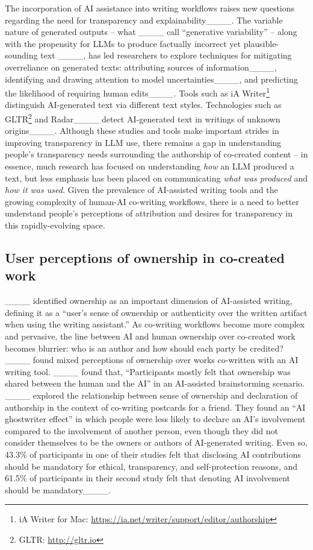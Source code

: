 The incorporation of AI assistance into writing workflows raises new questions regarding the need for transparency and explainability____. The variable nature of generated outputs -- what ____ call ``generative variability'' -- along with the propensity for LLMs to produce factually incorrect yet plausible-sounding text ____, has led researchers to explore techniques for mitigating overreliance on generated texts: attributing sources of information____, identifying and drawing attention to model uncertainties____, and predicting the likelihood of requiring human edits____. Tools such as iA Writer\footnote{iA Writer for Mac: \url{https://ia.net/writer/support/editor/authorship}} distinguish AI-generated text via different text styles. Technologies such as GLTR\footnote{GLTR: \url{http://gltr.io}} and Radar____ detect AI-generated text in writings of unknown origins____. Although these studies and tools make important strides in improving transparency in LLM use, there remains a gap in understanding people's transparency needs surrounding the authorship of co-created content -- in essence, much research has focused on understanding \emph{how} an LLM produced a text, but less emphasis has been placed on communicating \emph{what was produced} and \emph{how it was used}. Given the prevalence of AI-assisted writing tools and the growing complexity of human-AI co-writing workflows, there is a need to better understand people's perceptions of attribution and desires for transparency in this rapidly-evolving space.

\subsection{User perceptions of ownership in co-created work}
\label{sec:related-work-perceptions}

____ identified ownership as an important dimension of AI-assisted writing, defining it as a ``user’s sense of ownership or authenticity over the written artifact when using the writing assistant.'' As co-writing workflows become more complex and pervasive, the line between AI and human ownership over co-created work becomes blurrier: who is an author and how should each party be credited? ____ found mixed perceptions of ownership over works co-written with an AI writing tool. ____ found that, ``Participants mostly felt that ownership was shared between the human and the AI'' in an AI-assisted brainstorming scenario. ____ explored the relationship between sense of ownership and declaration of authorship in the context of co-writing postcards for a friend. They found an ``AI ghostwriter effect'' in which people were less likely to declare an AI's involvement compared to the involvement of another person, even though they did not consider themselves to be the owners or authors of AI-generated writing. Even so, 43.3\% of participants in one of their studies felt that disclosing AI contributions should be mandatory for ethical, transparency, and self-protection reasons, and 61.5\% of participants in their second study felt that denoting AI involvement should be mandatory____.

